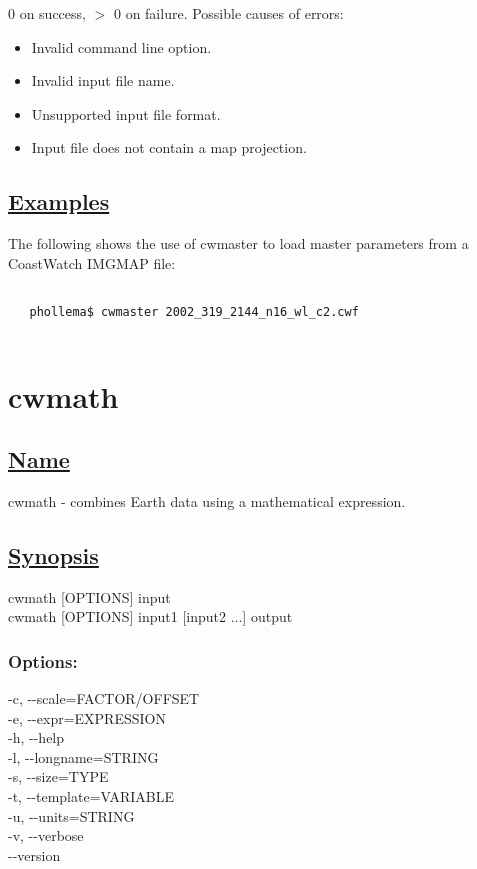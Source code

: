   0 on success, $>$ 0 on failure. Possible causes of errors:
\begin{itemize}
\item  Invalid command line option. 
\item  Invalid input file name. 
\item  Unsupported input file format. 
\item  Input file does not contain a map projection. 

\end{itemize}
\subsection*{\underline{Examples}}


  The following shows the use of cwmaster to load master parameters from a CoastWatch IMGMAP file:
\begin{verbatim}

   phollema$ cwmaster 2002_319_2144_n16_wl_c2.cwf
 
\end{verbatim}

\newpage
\section{cwmath} \hypertarget{cwmath}{}
\subsection*{\underline{Name}}


   cwmath - combines Earth data using a mathematical expression.  
\subsection*{\underline{Synopsis}}


  cwmath [OPTIONS] input \\ 
 cwmath [OPTIONS] input1 [input2 ...] output 
\subsubsection*{Options:}


  -c, -{-}scale=FACTOR/OFFSET \\ 
 -e, -{-}expr=EXPRESSION \\ 
 -h, -{-}help \\ 
 -l, -{-}longname=STRING \\ 
 -s, -{-}size=TYPE \\ 
 -t, -{-}template=VARIABLE \\ 
 -u, -{-}units=STRING \\ 
 -v, -{-}verbose \\ 
 -{-}version \\ 

